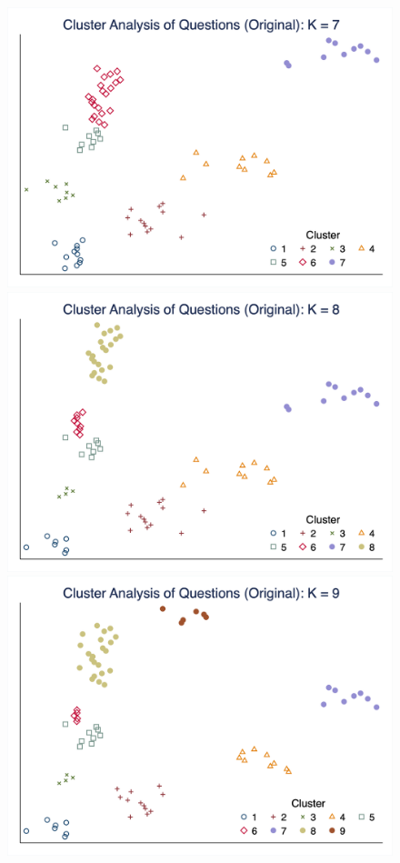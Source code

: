 \documentclass[10pt,leqno]{article}
\begin{document}
\begin{figure}  [h!]
\begin{center}
\includegraphics[scale=0.15]{CA_QuestionK7_ORI.png}
\includegraphics[scale=0.15]{CA_QuestionK8_ORI.png}
\includegraphics[scale=0.15]{CA_QuestionK9_ORI.png}

\end{center}
\end{figure}
\end{document}
